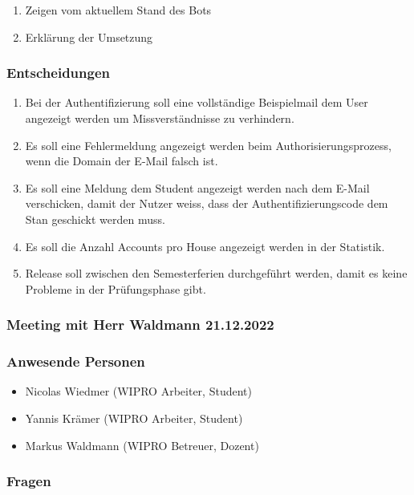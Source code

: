 \documentclass[a4paper, table]{article}
\begin{document}
\begin{enumerate}
    \item Zeigen vom aktuellem Stand des Bots
    \item Erklärung der Umsetzung
\end{enumerate}

\subsubsection*{Entscheidungen}

\begin{enumerate}
    \item Bei der Authentifizierung soll eine vollständige Beispielmail dem User angezeigt werden um Missverständnisse zu verhindern.
    \item Es soll eine Fehlermeldung angezeigt werden beim Authorisierungsprozess, wenn die Domain der E-Mail falsch ist.
    \item Es soll eine Meldung dem Student angezeigt werden nach dem E-Mail verschicken, damit der Nutzer weiss, dass der Authentifizierungscode dem Stan geschickt werden muss.
    \item Es soll die Anzahl Accounts pro House angezeigt werden in der Statistik.
    \item Release soll zwischen den Semesterferien durchgeführt werden, damit es keine Probleme in der Prüfungsphase gibt.
\end{enumerate}

\newpage
\subsubsection{Meeting mit Herr Waldmann 21.12.2022}


\subsubsection*{Anwesende Personen}

\begin{itemize}
    \item Nicolas Wiedmer (WIPRO Arbeiter, Student)
    \item Yannis Krämer (WIPRO Arbeiter, Student)
    \item Markus Waldmann (WIPRO Betreuer, Dozent)
\end{itemize}

\subsubsection*{Fragen}
\end{document}
